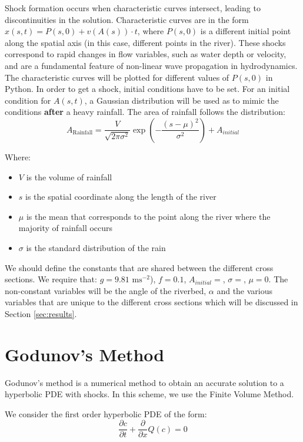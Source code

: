 \documentclass[12pt]{article}
\begin{document}
Shock formation occurs when characteristic curves intersect, leading to discontinuities in the solution. Characteristic curves are in the form $ x(s, t) = P(s, 0) + v(A(s))\cdot t$, where $P(s, 0)$ is a different initial point along the spatial axis (in this case, different points in the river). These shocks correspond to rapid changes in flow variables, such as water depth or velocity, and are a fundamental feature of non-linear wave propagation in hydrodynamics. The characteristic curves will be plotted for different values of $P(s, 0)$ in Python. In order to get a shock, initial conditions have to be set. For an initial condition for $A(s, t)$, a Gaussian distribution will be used as to mimic the conditions \textbf{after} a heavy rainfall. The area of rainfall follows the distribution:
\begin{equation}
     A_\text{Rainfall} = \frac{V}{\sqrt{2\pi\sigma^2}}\exp{\left(-\frac{(s - \mu)^2}{\sigma^2}\right)} + A_{initial}
\end{equation}

Where:
\begin{itemize}
    \item $V$ is the volume of rainfall
    \item $s$ is the spatial coordinate along the length of the river
    \item $\mu$ is the mean that corresponds to the point along the river where the majority of rainfall occurs
    \item $\sigma$ is the standard distribution of the rain
\end{itemize}

We should define the constants that are shared between the different cross sections. We require that: $g = 9.81 \text{ ms}^{-2}$), $f = 0.1$, $A_{initial} = $, $\sigma = $, $\mu  = 0$. The non-constant variables will be the angle of the riverbed, $\alpha$ and the various variables that are unique to the different cross sections which will be discussed in Section \ref{sec:results}.

\section{Godunov's Method}
Godunov's method is a numerical method to obtain an accurate solution to a hyperbolic PDE with shocks. In this scheme, we use the Finite Volume Method. 

We consider the first order hyperbolic PDE of the form:
\begin{equation}
    \frac{\partial c}{\partial t} + \frac{\partial}{\partial x}Q(c) = 0
\end{equation}
\end{document}
